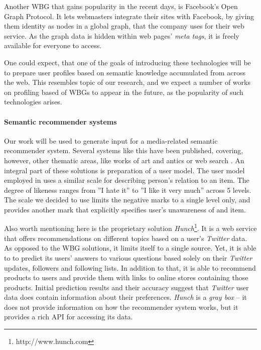 Another WBG that gains popularity in the recent days, is Facebook's Open Graph
Protocol. It lets webmasters integrate their sites with Facebook, by giving them
identity as nodes in a global graph, that the company uses for their
web service. As the graph data is hidden within web pages' \textit{meta tags},
it is freely available for everyone to access.

One could expect, that one of the goals of introducing these technologies will
be to prepare user profiles based on semantic knowledge accumulated from across
the web.  This resembles topic of our research, and we expect a number of works
on profiling based of WBGs to appear in the future, as the
popularity of such technologies arises.

\paragraph{Semantic recommender systems} Our work will be used to generate input
for a media-related semantic recommender system. Several systems like this have
been published, covering, however, other thematic areas, like works of art and
antics \cite{museums} or web search \cite{social-tagging}. An integral part of
these solutions is preparation of a user model. The user model employed in
\cite{museums} uses a similar scale for describing person's relation to an item.
The degree of likeness ranges from ''I hate it'' to ''I like it very much''
across 5 levels. The scale we decided to use limits the negative marks to
a single level only, and provides another mark that explicitly specifies user's unawareness
of and item.

Also worth mentioning here is the proprietary solution
\textit{Hunch}\footnote{http://www.hunch.com}. It is a web service that offers
recommendations on different topics based on a user's \textit{Twitter} data. As
opposed to the WBG solutions, it limits itself to a single source. Yet, it is
able to to predict its users' answers to various questions based solely on their
\textit{Twitter} updates, followers and following lists.
In addition to that, it is able to recommend products
to users and provide them with links to online stores containing those products.
Initial prediction results and their accuracy suggest that
\textit{Twitter} user data does contain information about their preferences.
\textit{Hunch} is a \textit{gray box}
--  it does not provide information on how the recommender system works, but it
provides a rich API for accessing its data.
